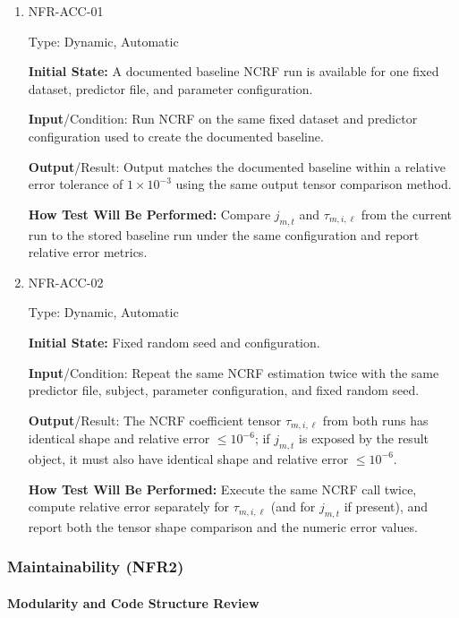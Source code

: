 \documentclass[12pt, titlepage]{article}
\begin{document}
\begin{enumerate}

\item{NFR-ACC-01\\}

Type: Dynamic, Automatic
					
\textbf{Initial State:} A documented baseline NCRF run is available for one fixed dataset, predictor file, and parameter configuration.
					
\textbf{Input}/Condition: Run NCRF on the same fixed dataset and predictor configuration used to create the documented baseline.
					
\textbf{Output}/Result: Output matches the documented baseline within a relative error tolerance of $1\times 10^{-3}$ using the same output tensor comparison method.
					
\textbf{How Test Will Be Performed:} Compare $j_{m,t}$ and $\tau_{m,i,\ell}$ from the current run to the stored baseline run under the same configuration and report relative error metrics.
					
\item{NFR-ACC-02\\}

Type: Dynamic, Automatic
					
\textbf{Initial State:} Fixed random seed and configuration.
					
\textbf{Input}/Condition: Repeat the same NCRF estimation twice with the same predictor file, subject, parameter configuration, and fixed random seed.
					
\textbf{Output}/Result: The NCRF coefficient tensor $\tau_{m,i,\ell}$ from both runs has identical shape and relative error $\leq 10^{-6}$; if $j_{m,t}$ is exposed by the result object, it must also have identical shape and relative error $\leq 10^{-6}$.
					
\textbf{How Test Will Be Performed:} Execute the same NCRF call twice, compute relative error separately for $\tau_{m,i,\ell}$ (and for $j_{m,t}$ if present), and report both the tensor shape comparison and the numeric error values.

\end{enumerate}

\subsubsection{Maintainability (NFR2)}
		
\paragraph{Modularity and Code Structure Review}
\end{document}
